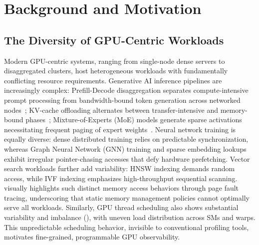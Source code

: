 \section{Background and Motivation}

\subsection{The Diversity of GPU-Centric Workloads}

Modern GPU-centric systems, ranging from single-node dense servers to disaggregated clusters, host heterogeneous workloads with fundamentally conflicting resource requirements. Generative AI inference pipelines are increasingly complex: Prefill-Decode disaggregation separates compute-intensive prompt processing from bandwidth-bound token generation across networked nodes~\cite{zhong2024distserve,patel2024splitwise}; KV-cache offloading alternates between transfer-intensive and memory-bound phases~\cite{sheng2023flexgen,kwon2023efficient}; Mixture-of-Experts (MoE) models generate sparse activations necessitating frequent paging of expert weights~\cite{gale2023megablocks,he2021fastmoe}. Neural network training is equally diverse: dense distributed training relies on predictable synchronization, whereas Graph Neural Network (GNN) training and sparse embedding lookups exhibit irregular pointer-chasing accesses that defy hardware prefetching. Vector search workloads further add variability: HNSW indexing demands random access, while IVF indexing emphasizes high-throughput sequential scanning.  visually highlights such distinct memory access behaviors through page fault tracing, underscoring that static memory management policies cannot optimally serve all workloads. Similarly, GPU thread scheduling also shows substantial variability and imbalance (), with uneven load distribution across SMs and warps. This unpredictable scheduling behavior, invisible to conventional profiling tools, motivates fine-grained, programmable GPU observability.



